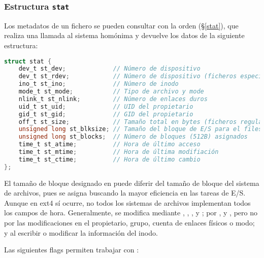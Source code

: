 \subsubsection{Estructura \texttt{stat}}

Los metadatos de un fichero se pueden consultar con la orden  (\S\ref{stat}), que realiza una llamada al sistema homónima y devuelve los datos de la siguiente estructura:

\begin{lstlisting}[language=C]
struct stat {
	dev_t st_dev;             // Número de dispositivo
	dev_t st_rdev;            // Número de dispositivo (ficheros especiales)
	ino_t st_ino;             // Número de inodo
	mode_t st_mode;           // Tipo de archivo y mode
	nlink_t st_nlink;         // Número de enlaces duros
	uid_t st_uid;             // UID del propietario
	gid_t st_gid;             // GID del propietario
	off_t st_size;            // Tamaño total en bytes (ficheros regulares)
	unsigned long st_blksize; // Tamaño del bloque de E/S para el filesystem
	unsigned long st_blocks;  // Número de bloques (512B) asignados
	time_t st_atime;          // Hora de último acceso
	time_t st_mtime;          // Hora de última modifiación
	time_t st_ctime;          // Hora de último cambio
};
\end{lstlisting}

El tamaño de bloque designado en  puede diferir del tamaño de bloque del sistema de archivos, pues se asigna buscando la mayor eficiencia en las tareas de E/S.
Aunque en ext4 sí ocurre, no todos los sistemas de archivos implementan todos los campos de hora.
Generalmente,  se modifica mediante , , ,  y ;  por ,  y , pero no por las modificaciones en el propietario, grupo, cuenta de enlaces físicos o modo; y  al escribir o modificar la información  del inodo.

Las siguientes flags permiten trabajar con :

